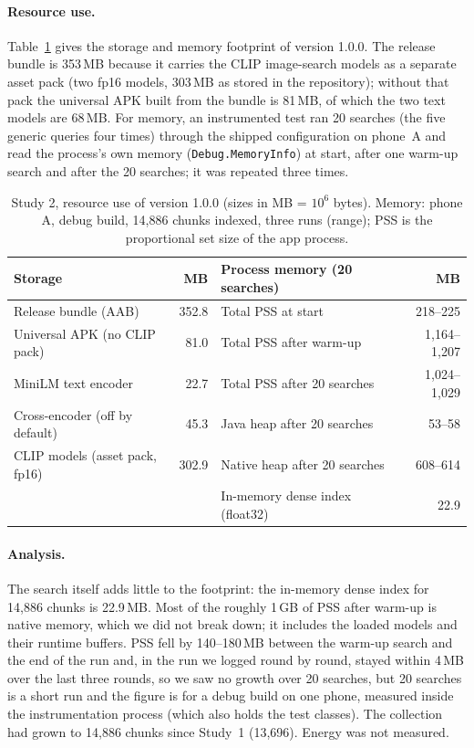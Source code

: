 \documentclass[11pt,a4paper]{article}
\begin{document}
\paragraph{Resource use.} Table~\ref{tab:resources} gives the storage and memory footprint of version 1.0.0. The release bundle is 353\,MB because it carries the CLIP image-search models as a separate asset pack (two fp16 models, 303\,MB as stored in the repository); without that pack the universal APK built from the bundle is 81\,MB, of which the two text models are 68\,MB. For memory, an instrumented test ran 20 searches (the five generic queries four times) through the shipped configuration on phone~A and read the process's own memory (\texttt{Debug.MemoryInfo}) at start, after one warm-up search and after the 20 searches; it was repeated three times.

\begin{table}[tbp]
\centering\small
\caption{Study 2, resource use of version 1.0.0 (sizes in MB = $10^6$ bytes). Memory: phone A, debug build, 14,886 chunks indexed, three runs (range); PSS is the proportional set size of the app process.}
\label{tab:resources}
\begin{tabular}{lr@{\hspace{2.5em}}lr}
\toprule
Storage & MB & Process memory (20 searches) & MB \\
\midrule
Release bundle (AAB) & 352.8 & Total PSS at start & 218--225 \\
Universal APK (no CLIP pack) & 81.0 & Total PSS after warm-up & 1,164--1,207 \\
MiniLM text encoder & 22.7 & Total PSS after 20 searches & 1,024--1,029 \\
Cross-encoder (off by default) & 45.3 & Java heap after 20 searches & 53--58 \\
CLIP models (asset pack, fp16) & 302.9 & Native heap after 20 searches & 608--614 \\
 & & In-memory dense index (float32) & 22.9 \\
\bottomrule
\end{tabular}
\end{table}

\paragraph{Analysis.} The search itself adds little to the footprint: the in-memory dense index for 14,886 chunks is 22.9\,MB. Most of the roughly 1\,GB of PSS after warm-up is native memory, which we did not break down; it includes the loaded models and their runtime buffers. PSS fell by 140--180\,MB between the warm-up search and the end of the run and, in the run we logged round by round, stayed within 4\,MB over the last three rounds, so we saw no growth over 20 searches, but 20 searches is a short run and the figure is for a debug build on one phone, measured inside the instrumentation process (which also holds the test classes). The collection had grown to 14,886 chunks since Study~1 (13,696). Energy was not measured.
\end{document}
